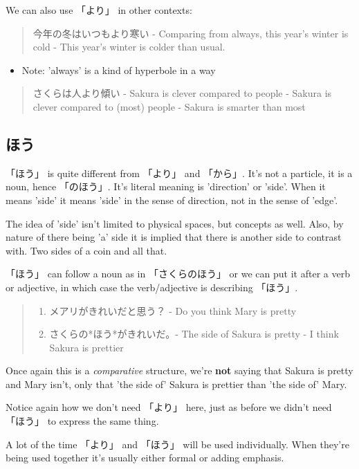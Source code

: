 \documentclass[11pt]{article}
\begin{document}
We can also use 「より」 in other contexts:
\begin{quote}
今年の冬はいつもより寒い - Comparing from always, this year's winter is cold - This year's winter is colder than usual.
\end{quote}
\begin{itemize}
\item Note: 'always' is a kind of hyperbole in a way
\end{itemize}

\begin{quote}
さくらは人より傾い - Sakura is clever compared to people - Sakura is clever compared to (most) people - Sakura is smarter than most
\end{quote}

\subsection{ほう}
\label{sec:org662acb0}
「ほう」 is quite different from 「より」 and 「から」. It's not a particle, it is a noun, hence 「のほう」. It's literal meaning is 'direction' or 'side'. When it means 'side' it means 'side' in the sense of direction, not in the sense of 'edge'.

The idea of 'side' isn't limited to physical spaces, but concepts as well. Also, by nature of there being 'a' side it is implied that there is another side to contrast with. Two sides of a coin and all that.

「ほう」 can follow a noun as in 「さくらのほう」 or we can put it after a verb or adjective, in which case the verb/adjective is describing 「ほう」.
\begin{quote}
\begin{enumerate}
\item メアリがきれいだと思う？ - Do you think Mary is pretty
\item さくらの*ほう*がきれいだ。- The side of Sakura is pretty - I think Sakura is prettier
\end{enumerate}
\end{quote}
Once again this is a \emph{comparative} structure, we're \textbf{not} saying that Sakura is pretty and Mary isn't, only that 'the side of' Sakura is prettier than 'the side of' Mary.

Notice again how we don't need 「より」 here, just as before we didn't need 「ほう」 to express the same thing.

A lot of the time 「より」 and 「ほう」 will be used individually. When they're being used together it's usually either formal or adding emphasis.
\end{document}
